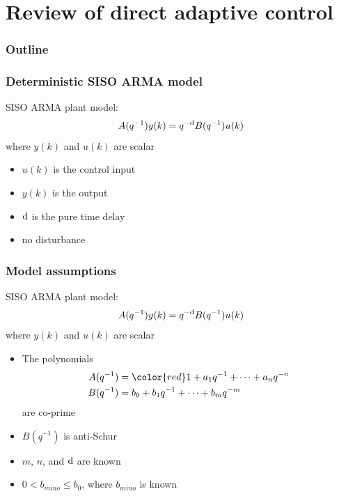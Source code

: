 \section{Review of direct adaptive control}
\begin{frame}
    \frametitle{Outline}
    \tableofcontents[currentsection]
\end{frame}

\begin{frame}
    \frametitle{Deterministic SISO ARMA model}

    SISO ARMA plant model:
    \begin{equation*}
        A(q^{-1}) y(k) = q^{-\textrm{d}} B(q^{-1}) u(k)
    \end{equation*}
    where $y(k)$ and $u(k)$ are scalar

    \begin{itemize}
        \item
        $u(k)$ is the control input

        \item
        $y(k)$ is the output

        \item
        $\textrm{d}$ is the pure time delay

        \item
        no disturbance
    \end{itemize}
\end{frame}

\begin{frame}
    \frametitle{Model assumptions}

    SISO ARMA plant model:
    \begin{equation*}
        A(q^{-1}) y(k) = q^{-\textrm{d}} B(q^{-1}) u(k)
    \end{equation*}
    where $y(k)$ and $u(k)$ are scalar

    \begin{itemize}
        \item
        The polynomials
        \begin{align*}
            A(q^{-1}) & = {\color{red} 1} + a_1 q^{-1} + \cdots + a_n q^{-n} \\
            B(q^{-1}) & = b_0 + b_1 q^{-1} + \cdots + b_m q^{-m}
        \end{align*}
        are co-prime

        \item
        $B(q^{-1})$ is anti-Schur

        \item
        $m$, $n$, and $\textrm{d}$ are known

        \item
        $0 < b_{mino} \leq b_0$, where $b_{mino}$ is known
    \end{itemize}
\end{frame}


